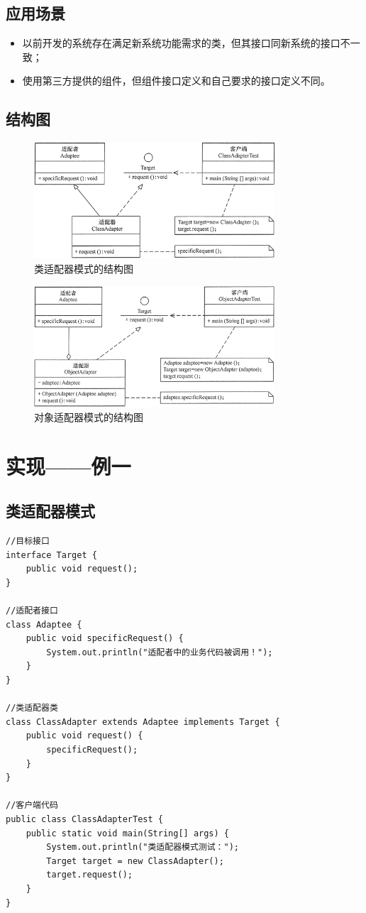 \subsection{应用场景}
\begin{itemize}
	\item 以前开发的系统存在满足新系统功能需求的类，但其接口同新系统的接口不一致；
	\item 使用第三方提供的组件，但组件接口定义和自己要求的接口定义不同。
\end{itemize}
\subsection{结构图}
\begin{figure}[!h]
	\centering
	\includegraphics[width=0.8\textwidth]{image/2-1}
	\caption{类适配器模式的结构图}
\end{figure}
\begin{figure}[!h]
	\centering
	\includegraphics[width=0.8\textwidth]{image/2-2}
	\caption{对象适配器模式的结构图}
\end{figure}
\section{实现——例一}
\subsection{类适配器模式}
\begin{lstlisting}
//目标接口
interface Target {
	public void request();
}

//适配者接口
class Adaptee {
	public void specificRequest() {
		System.out.println("适配者中的业务代码被调用！");
	}
}

//类适配器类
class ClassAdapter extends Adaptee implements Target {
	public void request() {
		specificRequest();
	}
}

//客户端代码
public class ClassAdapterTest {
	public static void main(String[] args) {
		System.out.println("类适配器模式测试：");
		Target target = new ClassAdapter();
		target.request();
	}
}
\end{lstlisting}
